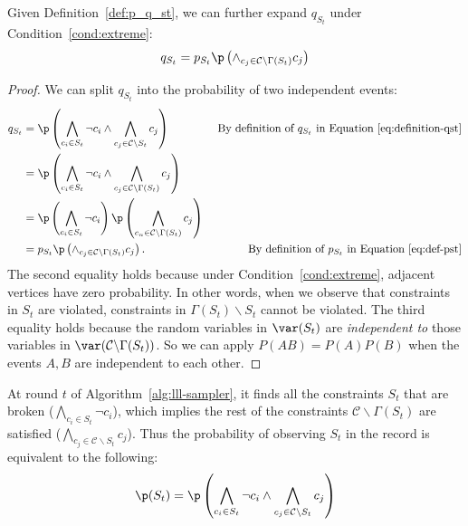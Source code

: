 \begin{lemma} \label{lem:recursion_start}
Given Definition~\ref{def:p_q_st}, we can further expand $q_{S_t}$ under Condition~\ref{cond:extreme}:
\begin{equation*}
q_{S_t}= p_{S_t}\p \left( \wedge_{c_j \in \mathcal{C}\backslash \Gamma(S_t)}c_j\right)
\end{equation*}
\begin{proof}
We can split $q_{S_t}$ into the probability of two independent events:
\begin{align*} 
    q_{S_t}&=\p\left(\bigwedge_{c_i \in S_t}\neg{c}_i \wedge \bigwedge_{c_j \in \mathcal{C}\backslash S_t}c_j\right) &\text{ By definition of $q_{S_t}$ in Equation~\eqref{eq:definition-qst}}\\
    &=\p\left(\bigwedge_{c_i \in S_t}\neg{c}_i \wedge \bigwedge_{c_j \in \mathcal{C}\backslash \Gamma(S_t)}c_j\right) \\
    &=\p\left(\bigwedge_{c_i \in S_t}\neg{c}_i\right) \p \left( \bigwedge_{c_n \in \mathcal{C}\backslash \Gamma(S_t)}c_j\right)\\
    &= p_{S_t}\p \left( \wedge_{c_j \in \mathcal{C}\backslash \Gamma(S_t)}c_j\right). &\text{ By definition of $p_{S_t}$ in Equation~\eqref{eq:def-pst}}
\end{align*}
The second equality holds because under  Condition~\ref{cond:extreme}, adjacent vertices have zero probability. In other words, when we observe that constraints in $S_t$ are violated, constraints in $\Gamma(S_t)\backslash S_t$ cannot be violated. The third equality holds because the random variables in $\var(S_t)$ are \textit{independent to} 
those variables in $\var(\mathcal{C}\backslash\Gamma(S_t))$. {So we can apply $P(AB)=P(A)P(B)$ when the events $A,B$  are independent to each other.}
\end{proof}
\end{lemma}

\begin{remark} \label{rem:equal}
At round $t$ of Algorithm~\ref{alg:lll-sampler},  it finds all the constraints $S_t$ that are broken ($\bigwedge_{c_i \in S_t}\neg{c}_i $), which implies the rest of the constraints $\mathcal{C}\backslash \Gamma(S_t)$ are satisfied ($\bigwedge_{c_j \in \mathcal{C}\backslash S_t}c_j$). Thus the probability of observing $S_t$ in the record is equivalent to the following:
\begin{align} \label{eq:st-expand}
\p(S_t)=\p\left(\bigwedge_{c_i \in S_t}\neg{c}_i \wedge \bigwedge_{c_j \in \mathcal{C}\backslash S_t}c_j\right)
\end{align}
\end{remark}

